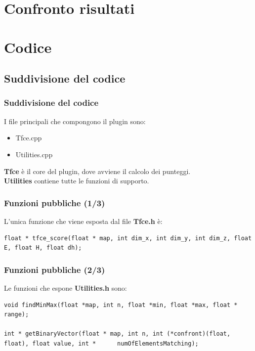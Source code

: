 \documentclass{beamer}
\begin{document}
\section{Confronto risultati}
\begin{frame}

\end{frame}

\section{Codice}
\subsection{Suddivisione del codice}
\begin{frame}
\frametitle{Suddivisione del codice}
I file principali che compongono il plugin sono:
\begin{itemize}
\item{Tfce.cpp}
\item{Utilities.cpp}
\end{itemize}
\vfill
\textbf{Tfce} è il core del plugin, dove avviene il calcolo dei punteggi.\\
\smallskip
\textbf{Utilities} contiene tutte le funzioni di supporto.
\end{frame}

\begin{frame}[fragile]
\frametitle{Funzioni pubbliche (1/3)}
L'unica funzione che viene esposta dal file \textbf{Tfce.h} è:
\begin{center}
\begin{lstlisting}
float * tfce_score(float * map, int dim_x, int dim_y, int dim_z, float E, float H, float dh);
\end{lstlisting}
\end{center}
\end{frame}

\begin{frame}[fragile]
\frametitle{Funzioni pubbliche (2/3)}
Le funzioni che espone \textbf{Utilities.h} sono:
\begin{center}
\begin{lstlisting}
void findMinMax(float *map, int n, float *min, float *max, float * range);

int * getBinaryVector(float * map, int n, int (*confront)(float, float), float value, int *      numOfElementsMatching);
\end{lstlisting}
\end{center}
\end{frame}
\end{document}
